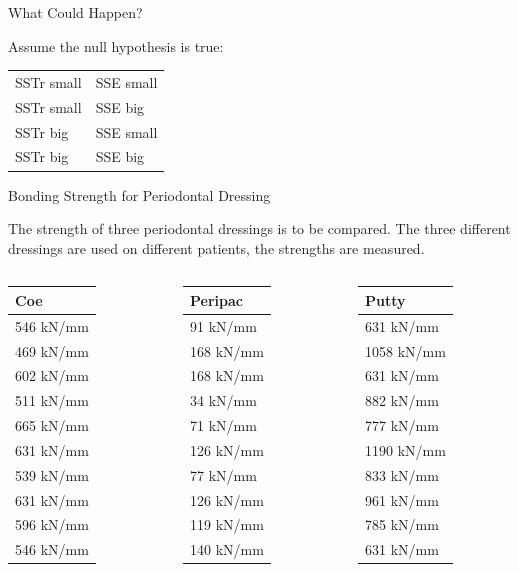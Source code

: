 \begin{frame}{What Could Happen?}

  Assume the null hypothesis is true: \\
  \begin{tabular}{ll}
    SSTr small & SSE small \\
    SSTr small & SSE big \\
    SSTr big & SSE small \\
    SSTr big & SSE big \\
  \end{tabular}
  
\end{frame}

\begin{frame}{Bonding Strength for Periodontal Dressing}

  The strength of three periodontal dressings is to be compared. The
  three different dressings are used on different patients, the
  strengths are measured.

  \begin{columns}
    \begin{tabular}{l}
      Coe \\ \hline
      546 kN/mm\\ 469 kN/mm\\ 602 kN/mm\\ 511 kN/mm\\ 665 kN/mm\\ 631
      kN/mm\\ 539 kN/mm\\ 631 kN/mm\\ 596 kN/mm\\ 546 kN/mm
    \end{tabular}
    \begin{tabular}{l}
      Peripac \\ \hline
      91 kN/mm\\ 168 kN/mm\\ 168 kN/mm\\ 34 kN/mm\\ 71 kN/mm\\ 126 kN/mm\\
      77 kN/mm\\ 126 kN/mm\\ 119 kN/mm\\ 140 kN/mm
    \end{tabular}

    \begin{tabular}{l}
      Putty \\ \hline
      631 kN/mm\\ 1058 kN/mm\\ 631 kN/mm\\ 882 kN/mm\\ 777 kN/mm\\
      1190 kN/mm\\ 833 kN/mm\\ 961 kN/mm\\ 785 kN/mm\\ 631 kN/mm
    \end{tabular}


\end{columns}
\end{frame}
